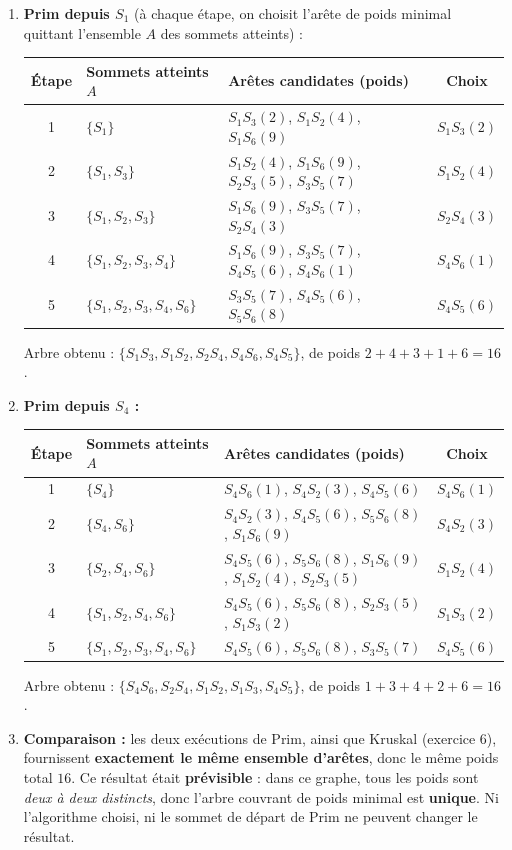 \documentclass[11pt]{article}
\begin{document}
\begin{corrige}
\begin{enumerate}
\item \textbf{Prim depuis $S_1$} (à chaque étape, on choisit l'arête de poids minimal quittant l'ensemble $A$ des sommets atteints) :
\begin{center}
\begin{tabular}{|c|l|l|c|}
\hline
\rowcolor{popblueL} Étape & Sommets atteints $A$ & Arêtes candidates (poids) & Choix \\
\hline
1 & $\{S_1\}$ & $S_1S_3(2)$, $S_1S_2(4)$, $S_1S_6(9)$ & $S_1S_3(2)$ \\
2 & $\{S_1, S_3\}$ & $S_1S_2(4)$, $S_1S_6(9)$, $S_2S_3(5)$, $S_3S_5(7)$ & $S_1S_2(4)$ \\
3 & $\{S_1, S_2, S_3\}$ & $S_1S_6(9)$, $S_3S_5(7)$, $S_2S_4(3)$ & $S_2S_4(3)$ \\
4 & $\{S_1, S_2, S_3, S_4\}$ & $S_1S_6(9)$, $S_3S_5(7)$, $S_4S_5(6)$, $S_4S_6(1)$ & $S_4S_6(1)$ \\
5 & $\{S_1, S_2, S_3, S_4, S_6\}$ & $S_3S_5(7)$, $S_4S_5(6)$, $S_5S_6(8)$ & $S_4S_5(6)$ \\
\hline
\end{tabular}
\end{center}
Arbre obtenu : $\{S_1S_3, S_1S_2, S_2S_4, S_4S_6, S_4S_5\}$, de poids $2 + 4 + 3 + 1 + 6 = 16$.
\item \textbf{Prim depuis $S_4$ :}
\begin{center}
\begin{tabular}{|c|l|l|c|}
\hline
\rowcolor{popblueL} Étape & Sommets atteints $A$ & Arêtes candidates (poids) & Choix \\
\hline
1 & $\{S_4\}$ & $S_4S_6(1)$, $S_4S_2(3)$, $S_4S_5(6)$ & $S_4S_6(1)$ \\
2 & $\{S_4, S_6\}$ & $S_4S_2(3)$, $S_4S_5(6)$, $S_5S_6(8)$, $S_1S_6(9)$ & $S_4S_2(3)$ \\
3 & $\{S_2, S_4, S_6\}$ & $S_4S_5(6)$, $S_5S_6(8)$, $S_1S_6(9)$, $S_1S_2(4)$, $S_2S_3(5)$ & $S_1S_2(4)$ \\
4 & $\{S_1, S_2, S_4, S_6\}$ & $S_4S_5(6)$, $S_5S_6(8)$, $S_2S_3(5)$, $S_1S_3(2)$ & $S_1S_3(2)$ \\
5 & $\{S_1, S_2, S_3, S_4, S_6\}$ & $S_4S_5(6)$, $S_5S_6(8)$, $S_3S_5(7)$ & $S_4S_5(6)$ \\
\hline
\end{tabular}
\end{center}
Arbre obtenu : $\{S_4S_6, S_2S_4, S_1S_2, S_1S_3, S_4S_5\}$, de poids $1 + 3 + 4 + 2 + 6 = 16$.
\item \textbf{Comparaison :} les deux exécutions de Prim, ainsi que Kruskal (exercice 6), fournissent \textbf{exactement le même ensemble d'arêtes}, donc le même poids total $16$. Ce résultat était \textbf{prévisible} : dans ce graphe, tous les poids sont \emph{deux à deux distincts}, donc l'arbre couvrant de poids minimal est \textbf{unique}. Ni l'algorithme choisi, ni le sommet de départ de Prim ne peuvent changer le résultat.
\end{enumerate}
\end{corrige}
\end{document}
